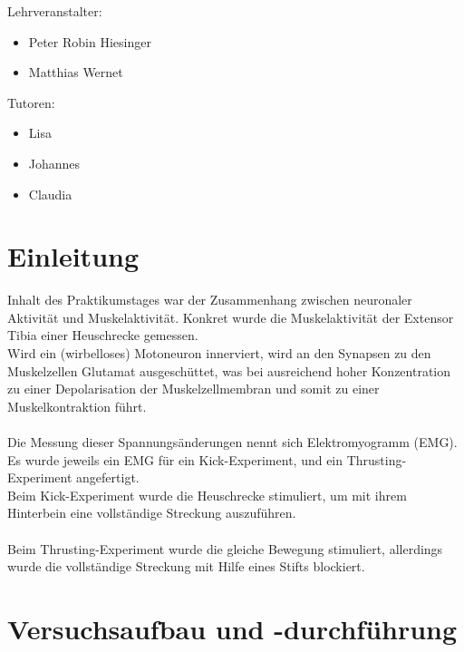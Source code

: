\documentclass[a4paper]{article}
\begin{document}
\begin{titlepage}
{\LARGE Lehrveranstalter:}
\begin{itemize}
\item  Peter Robin Hiesinger
\item Matthias Wernet
\end{itemize}
\vspace{2.5\baselineskip}

{\LARGE Tutoren:}
\begin{itemize}
\item Lisa
\item Johannes
\item Claudia
\end{itemize}
	
\end{titlepage}


\section{Einleitung}
Inhalt des Praktikumstages war der Zusammenhang zwischen neuronaler Aktivität und Muskelaktivität. Konkret wurde die Muskelaktivität der Extensor Tibia einer Heuschrecke gemessen.\\
Wird ein (wirbelloses) Motoneuron innerviert, wird an den Synapsen zu den Muskelzellen Glutamat ausgeschüttet, was bei ausreichend hoher Konzentration zu einer Depolarisation der Muskelzellmembran und somit zu einer Muskelkontraktion führt.\\ \\
Die Messung dieser Spannungsänderungen nennt sich Elektromyogramm (EMG).\\
Es wurde jeweils ein EMG für ein Kick-Experiment, und ein Thrusting-Experiment angefertigt.\\
Beim Kick-Experiment wurde die Heuschrecke stimuliert, um mit ihrem Hinterbein eine vollständige Streckung auszuführen. \\ \\
Beim Thrusting-Experiment wurde die gleiche Bewegung stimuliert, allerdings wurde die vollständige Streckung mit Hilfe eines Stifts blockiert.

\section{Versuchsaufbau und -durchführung}
\end{document}
